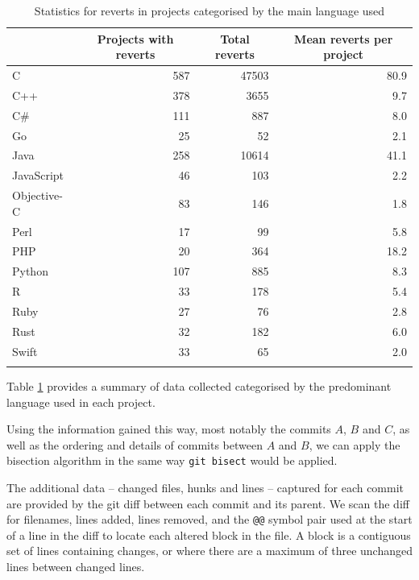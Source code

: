 \documentclass[pdflatex, sn-mathphys, referee]{sn-jnl}%
\theoremstyle{thmstyleone}%
\theoremstyle{thmstyletwo}%
\theoremstyle{thmstylethree}%
\def\code{\tt}
\theoremstyle{thmstyleone}
\begin{document}
\begin{table}[ht]
\begin{center}
\begin{minipage}{\textwidth}
\begin{tabular*}{\textwidth}{l r r r}
\toprule%
 & \multicolumn{1}{c}{Projects with reverts} & \multicolumn{1}{c}{Total reverts} & \multicolumn{1}{c}{Mean reverts per project} \\
\midrule
C & 587 & 47503 & 80.9 \\
C++ & 378 & 3655 & 9.7 \\
C\# & 111 & 887 & 8.0 \\
Go & 25 & 52 & 2.1 \\
Java & 258 & 10614 & 41.1 \\
JavaScript & 46 & 103 & 2.2 \\
Objective-C & 83 & 146  & 1.8 \\
Perl & 17 & 99 & 5.8 \\
PHP & 20 & 364 & 18.2 \\
Python & 107 & 885 & 8.3 \\
R & 33 & 178 & 5.4 \\
Ruby & 27 & 76 & 2.8 \\
Rust & 32 & 182 & 6.0 \\
Swift & 33 & 65 & 2.0 \\
\botrule
\end{tabular*}
\caption{\label{table:project-stats}Statistics for reverts in projects categorised by the main language used}
\end{minipage}
\end{center}
\end{table}

Table \ref{table:project-stats} provides a summary of data collected categorised by the predominant language used in each project.

Using the information gained this way, most notably the commits $A$, $B$ and $C$, as well as the ordering and details of commits between $A$ and $B$, we can apply the bisection algorithm in the same way {\code git bisect} would be applied.

The additional data -- changed files, hunks and lines -- captured for each commit are provided by the git diff between each commit and its parent. We scan the diff for filenames, lines added, lines removed, and the {\code @@} symbol pair used at the start of a line in the diff to locate each altered block in the file. A block is a contiguous set of lines containing changes, or where there are a maximum of three unchanged lines between changed lines.
\end{document}
